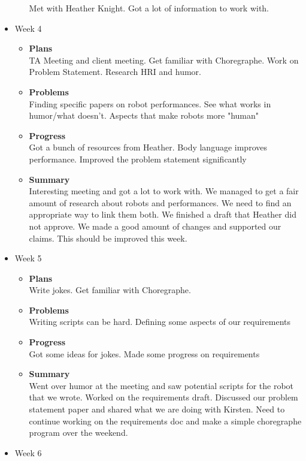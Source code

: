 \begin{itemize}
\begin{itemize}
				Met with Heather Knight. Got a lot of information to work with.
			\end{itemize}
		\item{Week 4}
			\begin{itemize}
				\item \textbf{Plans} \\
				TA Meeting and client meeting. Get familiar with Choregraphe. Work on Problem Statement. Research HRI and humor.
				\item \textbf{Problems} \\
				Finding specific papers on robot performances. See what works in humor/what doesn’t. Aspects that make robots more "human"

				\item \textbf{Progress} \\
				Got a bunch of resources from Heather. Body language improves performance. Improved the problem statement significantly
				\item \textbf{Summary} \\
				Interesting meeting and got a lot to work with. We managed to get a fair amount of research about robots and performances. We need to find an appropriate way to link them both. 
				We finished a draft that Heather did not approve. We made a good amount of changes and supported our claims. This should be improved this week.
			\end{itemize}
		\item{Week 5}
			\begin{itemize}
				\item \textbf{Plans} \\
				Write jokes. Get familiar with Choregraphe.
				\item \textbf{Problems} \\
				Writing scripts can be hard. Defining some aspects of our requirements
				\item \textbf{Progress} \\
				Got some ideas for jokes. Made some progress on requirements
				\item \textbf{Summary} \\
				Went over humor at the meeting and saw potential scripts for the robot that we wrote. Worked on the requirements draft. Discussed our problem statement paper and shared what we are doing with Kirsten. Need to continue working on the requirements doc and make a simple choregraphe program over the weekend. 
			\end{itemize}
		\item{Week 6}

\end{itemize}
